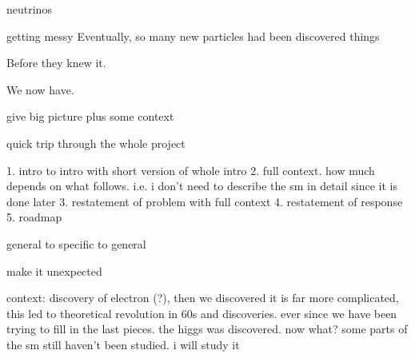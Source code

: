 neutrinos

getting messy
Eventually, so many new particles had been discovered things 

Before they knew it.


We now have.


give big picture plus some context

quick trip through the whole project

1. intro to intro with short version of whole intro
2. full context. how much depends on what follows. i.e. i don't need to describe the sm in detail since it is done later
3. restatement of problem with full context
4. restatement of response
5. roadmap


general to specific to general

make it unexpected

context: discovery of electron (?), then we discovered it is far more complicated, this led to theoretical revolution in 60s and discoveries. ever since we have been trying to fill in the last pieces. the higgs was discovered. now what?
some parts of the sm still haven't been studied.
i will study it











